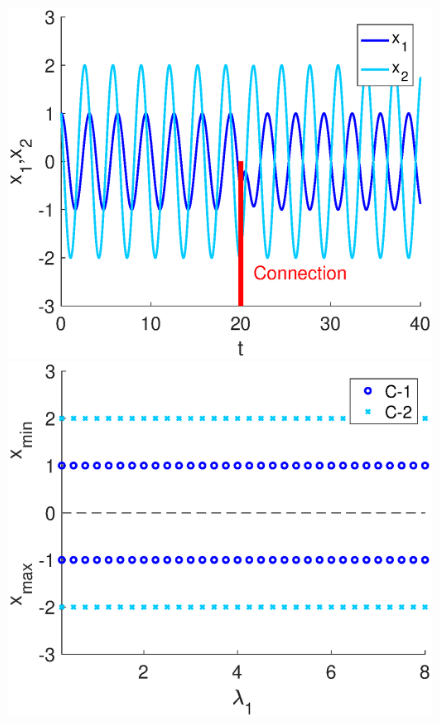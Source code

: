 \begin{figure}[htb]
   \begin{minipage}{0.32\linewidth}
            \begin{center}
                \includegraphics[width=1\linewidth]{Images/photo11_1.eps}
            \end{center}
        \end{minipage} 
        \begin{minipage}{0.32\linewidth}
            \begin{center}
                \includegraphics[width=1\linewidth]{Images/photo10_2.eps}

\end{center}
\end{minipage}
\end{figure}
